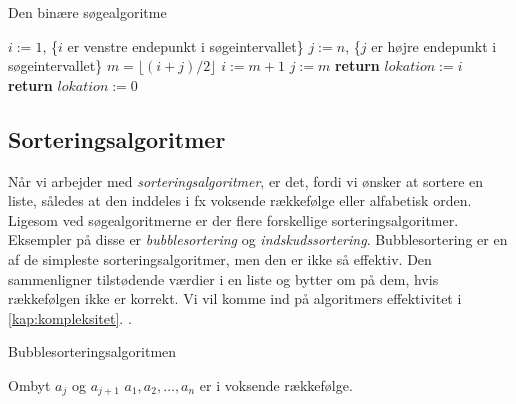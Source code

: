 \begin{algorithm}[H]
\caption{Den binære søgealgoritme}
\begin{algorithmic}[1]

    \State $i:=1$, \{$i$ er venstre endepunkt i søgeintervallet\}
    \State $j:=n$, \{$j$ er højre endepunkt i søgeintervallet\}
        \State $m=\lfloor (i+j)/2 \rfloor$
    		\State $i:=m+1$
    		\Else
    		\State $j:=m$
    		\EndIf    
    \EndWhile
    	\State \textbf{return} $lokation:=i$
    \Else
    	\State \textbf{return} $lokation:=0$
    \EndIf
  \label{roy's loop}
\EndProcedure

\end{algorithmic}
\label{alg:binaer}
\end{algorithm}

\subsection{Sorteringsalgoritmer} \label{kap:sortering}
Når vi arbejder med \emph{sorteringsalgoritmer}, er det, fordi vi ønsker at sortere en liste, således at den inddeles i fx voksende rækkefølge eller alfabetisk orden. Ligesom ved søgealgoritmerne er der flere forskellige sorteringsalgoritmer. Eksempler på disse er \emph{bubblesortering} og \emph{indskudssortering}. Bubblesortering er en af de simpleste sorteringsalgoritmer, men den er ikke så effektiv. Den sammenligner tilstødende værdier i en liste og bytter om på dem, hvis rækkefølgen ikke er korrekt. Vi vil komme ind på algoritmers effektivitet i \autoref{kap:kompleksitet}. .

\begin{algorithm}[H]
\caption{Bubblesorteringsalgoritmen}
\begin{algorithmic}[1]

\EndProcedure
{}
    			\State Ombyt $a_{j}$ og $a_{j+1}$ 	
\EndIf
\EndFor
\EndFor
\State $a_{1},a_{2},\dotsc,a_{n}$ er i voksende rækkefølge. 

\end{algorithmic}
\end{algorithm}



